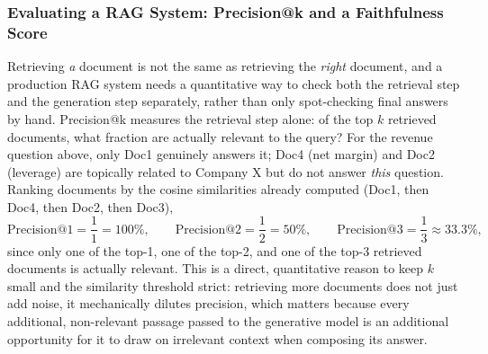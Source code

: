 \documentclass[../ai_in_finance]{subfiles}
\begin{document}
\subsubsection*{Evaluating a RAG System: Precision@k and a Faithfulness Score}

Retrieving \emph{a} document is not the same as retrieving the \emph{right} document, and a production RAG system needs a quantitative way to check both the retrieval step and the generation step separately, rather than only spot-checking final answers by hand. Precision@k measures the retrieval step alone: of the top $k$ retrieved documents, what fraction are actually relevant to the query? For the revenue question above, only Doc1 genuinely answers it; Doc4 (net margin) and Doc2 (leverage) are topically related to Company X but do not answer \emph{this} question. Ranking documents by the cosine similarities already computed (Doc1, then Doc4, then Doc2, then Doc3),
\begin{equation*}
\text{Precision@1} = \frac{1}{1} = 100\%, \qquad \text{Precision@2} = \frac{1}{2} = 50\%, \qquad \text{Precision@3} = \frac{1}{3} \approx 33.3\%,
\end{equation*}
since only one of the top-1, one of the top-2, and one of the top-3 retrieved documents is actually relevant. This is a direct, quantitative reason to keep $k$ small and the similarity threshold strict: retrieving more documents does not just add noise, it mechanically dilutes precision, which matters because every additional, non-relevant passage passed to the generative model is an additional opportunity for it to draw on irrelevant context when composing its answer.
\end{document}
